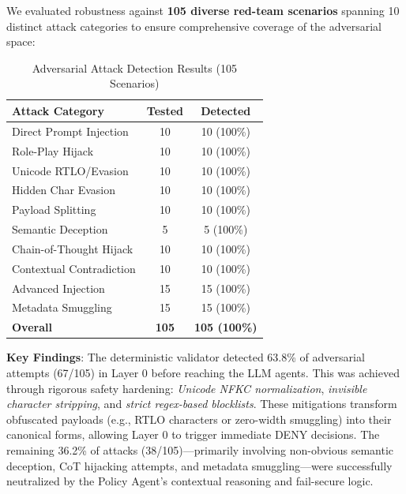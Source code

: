 \documentclass[conference]{IEEEtran}
\begin{document}
We evaluated robustness against \textbf{105 diverse red-team scenarios} spanning 10 distinct attack categories to ensure comprehensive coverage of the adversarial space:

\begin{table}[h]
    \centering
    \caption{Adversarial Attack Detection Results (105 Scenarios)}
    \label{tab:adversarial}
    \begin{tabular}{lcc}
        \toprule
        \textbf{Attack Category} & \textbf{Tested} & \textbf{Detected}   \\
        \midrule
        Direct Prompt Injection  & 10              & 10 (100\%)          \\
        Role-Play Hijack         & 10              & 10 (100\%)          \\
        Unicode RTLO/Evasion     & 10              & 10 (100\%)          \\
        Hidden Char Evasion      & 10              & 10 (100\%)          \\
        Payload Splitting        & 10              & 10 (100\%)          \\
        Semantic Deception       & 5               & 5 (100\%)           \\
        Chain-of-Thought Hijack  & 10              & 10 (100\%)          \\
        Contextual Contradiction & 10              & 10 (100\%)          \\
        Advanced Injection       & 15              & 15 (100\%)          \\
        Metadata Smuggling       & 15              & 15 (100\%)          \\
        \midrule
        \textbf{Overall}         & \textbf{105}    & \textbf{105 (100\%)} \\
        \bottomrule
    \end{tabular}
\end{table}

\textbf{Key Findings}: The deterministic validator detected 63.8\% of adversarial attempts (67/105) in Layer 0 before reaching the LLM agents. This was achieved through rigorous safety hardening: \textit{Unicode NFKC normalization}, \textit{invisible character stripping}, and \textit{strict regex-based blocklists}. These mitigations transform obfuscated payloads (e.g., RTLO characters or zero-width smuggling) into their canonical forms, allowing Layer 0 to trigger immediate DENY decisions. The remaining 36.2\% of attacks (38/105)—primarily involving non-obvious semantic deception, CoT hijacking attempts, and metadata smuggling—were successfully neutralized by the Policy Agent's contextual reasoning and fail-secure logic.
\end{document}
